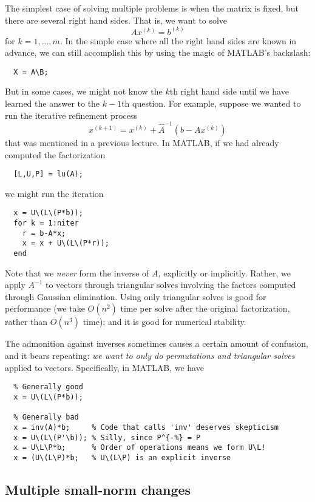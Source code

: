 \documentclass[12pt, leqno]{article}
\begin{document}
The simplest case of solving multiple problems is when the matrix
is fixed, but there are several right hand sides.  That is,
we want to solve
\[
  A x^{(k)} = b^{(k)}
\]
for $k = 1, \ldots, m$.  In the simple case where all the right hand
sides are known in advance, we can still accomplish this by using
the magic of MATLAB's backslash:
\begin{lstlisting}
  X = A\B;
\end{lstlisting}
But in some cases, we might not know the $k$th right hand side until
we have learned the answer to the $k-1$th question.  For example,
suppose we wanted to run the iterative refinement process
\[
  x^{(k+1)} = x^{(k)} + \hat{A}^{-1} (b-Ax^{(k)})
\]
that was mentioned in a previous lecture.  In MATLAB, if we had
already computed the factorization
\begin{lstlisting}
  [L,U,P] = lu(A);
\end{lstlisting}
we might run the iteration
\begin{lstlisting}
  x = U\(L\(P*b));
  for k = 1:niter
    r = b-A*x;
    x = x + U\(L\(P*r));
  end
\end{lstlisting}
Note that we {\em never} form the inverse of $A$, explicitly or implicitly.
Rather, we apply $A^{-1}$ to vectors through triangular solves involving
the factors computed through Gaussian elimination.  Using only
triangular solves is good for performance (we take $O(n^2)$ time per
solve after the original factorization, rather than $O(n^3)$ time);
and it is good for numerical stability.

The admonition against inverses sometimes causes a certain amount of
confusion, and it bears repeating: {\em we want to only do
  permutations and triangular solves} applied to vectors.
Specifically, in MATLAB, we have
\begin{lstlisting}
  % Generally good
  x = U\(L\(P*b));

  % Generally bad
  x = inv(A)*b;     % Code that calls 'inv' deserves skepticism
  x = U\(L\(P'\b)); % Silly, since P^{-%} = P
  x = U\L\P*b;      % Order of operations means we form U\L!
  x = (U\(L\P)*b;   % U\(L\P) is an explicit inverse
\end{lstlisting}

\subsection*{Multiple small-norm changes}
\end{document}

